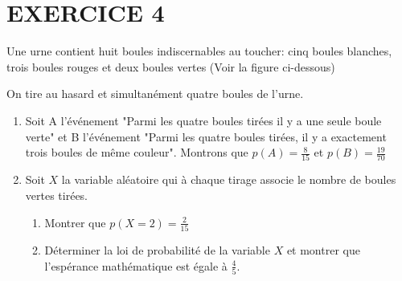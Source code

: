 \documentclass[13pts]{report}
\begin{document}
	\section*{EXERCICE 4}
	Une urne contient huit boules indiscernables au toucher: cinq boules blanches, trois boules rouges et deux boules vertes (Voir la figure ci-dessous)\\
	\begin{center}
	\end{center}
	On tire au hasard et simultanément quatre boules de l'urne.
	\begin{enumerate}
		\item Soit A l'événement "Parmi les quatre boules tirées il y a une seule boule verte" et B l'événement "Parmi les quatre boules tirées, il y a exactement trois boules de même couleur". Montrons que $p(A)=\frac{8}{15}$ et $p(B)=\frac{19}{70}$
		\item Soit $X$ la variable aléatoire qui à chaque tirage associe le nombre de boules vertes tirées.
		\begin{enumerate}
			\item Montrer que $p(X=2)=\frac{2}{15}$
			\item Déterminer la loi de probabilité de la variable $X$ et montrer que l'espérance mathématique est égale à $\frac{4}{5}.$
		\end{enumerate}
	\end{enumerate}

\end{document}
